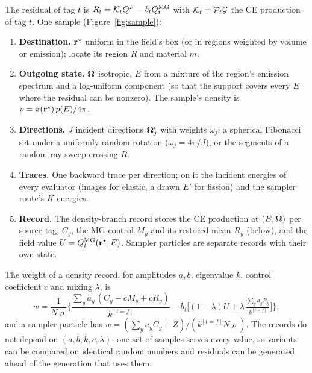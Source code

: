 The residual of tag $t$ is $R_t=\mathcal K_tQ^F-b_tQ^{\mathrm{MG}}_t$ with $\mathcal K_t=\mathcal P_t\mathcal G$ the CE production of
tag $t$. One sample (Figure~\ref{fig:sample}):
\begin{enumerate}
\item \textbf{Destination.} $\mathbf r^\star$ uniform in the field's box (or in regions weighted by volume
  or emission); locate its region $R$ and material $m$.
\item \textbf{Outgoing state.} $\boldsymbol\Omega$ isotropic, $E$ from a mixture of the region's emission spectrum
  and a log-uniform component (so that the support covers every $E$ where the residual can be
  nonzero). The sample's density is $\varrho=\pi(\mathbf r^\star)\,p(E)/4\pi$.
\item \textbf{Directions.} $J$ incident directions $\boldsymbol\Omega'_j$ with weights $\omega_j$: a spherical
  Fibonacci set under a uniformly random rotation ($\omega_j=4\pi/J$), or the segments of a random-ray
  sweep crossing $R$.
\item \textbf{Traces.} One backward trace per direction; on it the incident energies of every
  evaluator (images for elastic, a drawn $E'$ for fission) and the sampler route's $K$ energies.
\item \textbf{Record.} The density-branch record stores the CE production at $(E,\boldsymbol\Omega)$ per source
  tag, $C_y$, the MG control $M_y$ and its restored mean $R_y$ (below), and the field value
  $U=Q^{\mathrm{MG}}_t(\mathbf r^\star,E)$. Sampler particles are separate records with their own state.
\end{enumerate}
The weight of a density record, for amplitudes $a,b$, eigenvalue $k$, control coefficient $c$ and
mixing $\lambda$, is
\begin{equation}\label{eq:weight}
w=\frac{1}{N\varrho}\Big\{\frac{\sum_ya_y\,(C_y-cM_y+cR_y)}{k^{[t=f]}}-b_t\big[(1-\lambda)U+
\lambda\,\tfrac{\sum_ya_yR_y}{k^{[t=f]}}\big]\Big\},
\end{equation}
and a sampler particle has $w=(\sum_ya_yC_y+Z)/(k^{[t=f]}N\varrho)$. The records do not depend on
$(a,b,k,c,\lambda)$: one set of samples serves every value, so variants can be compared on identical
random numbers and residuals can be generated ahead of the generation that uses them.

